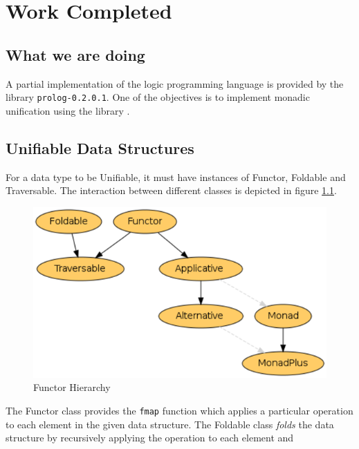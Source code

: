 \documentclass[thesis-solanki.tex]{subfiles}
\begin{document}
\chapter{Work Completed}\label{chap:workCompleted}
\section{What we are doing}
A partial implementation of the logic programming language  is provided by the library \texttt{prolog-0.2.0.1}. One of the 
objectives is to implement monadic unification using the library \cite{unification-fd-lib}. 


\section{Unifiable Data Structures}
For a data type to be Unifiable, it must have instances of Functor, Foldable and Traversable. The interaction between different classes is depicted in figure 
\ref{fig:Functor Hierarchy}.

\begin{figure}[th]
\centering
\includegraphics[scale = 0.7]{FunctorHierarchy.png}
\caption{Functor Hierarchy \cite{website:foldablenadtraversable}}
\label{fig:Functor Hierarchy}
\end{figure}  

The Functor class provides the \texttt{fmap} function which applies a particular operation to each element in the given data structure. The Foldable class \textit{folds} the data structure by recursively applying the operation to each element and 
\end{document}
